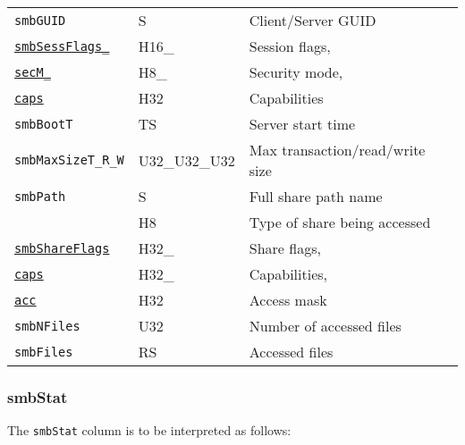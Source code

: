 \documentclass[documentation]{subfiles}
\begin{document}
\begin{longtable}{llll}
    {\tt smbGUID} & S & Client/Server GUID\\
    {\tt \hyperref[smbSessFlagsSecMCaps]{smbSessFlags\_}} & H16\_& Session flags,\\
    {\tt \qquad\hyperref[smbSessFlagsSecMCaps]{secM\_}} & \qquad H8\_ & \qquad Security mode,\\
    {\tt \qquad\hyperref[smbSessFlagsSecMCaps]{caps}} & \qquad H32 & \qquad Capabilities\\
    {\tt smbBootT} & TS & Server start time\\
    {\tt smbMaxSizeT\_R\_W} & U32\_U32\_U32 & Max transaction/read/write size\\
    {\tt smbPath} & S & Full share path name\\
    {\tt \nameref{smbShareT}} & H8 & Type of share being accessed\\
    {\tt \hyperref[smbShareFlagsCapsAcc]{smbShareFlags}} & H32\_ & Share flags, \\
    {\tt \qquad\hyperref[smbShareFlagsCapsAcc]{caps}} & \qquad H32\_ & \qquad Capabilities,\\
    {\tt \qquad\hyperref[smbShareFlagsCapsAcc]{acc}} & \qquad H32 & \qquad Access mask\\
    {\tt smbNFiles} & U32 & Number of accessed files\\
    {\tt smbFiles} & RS & Accessed files\\
    \bottomrule
\end{longtable}

\subsubsection{smbStat}\label{smbStat}
The {\tt smbStat} column is to be interpreted as follows:
\end{document}
